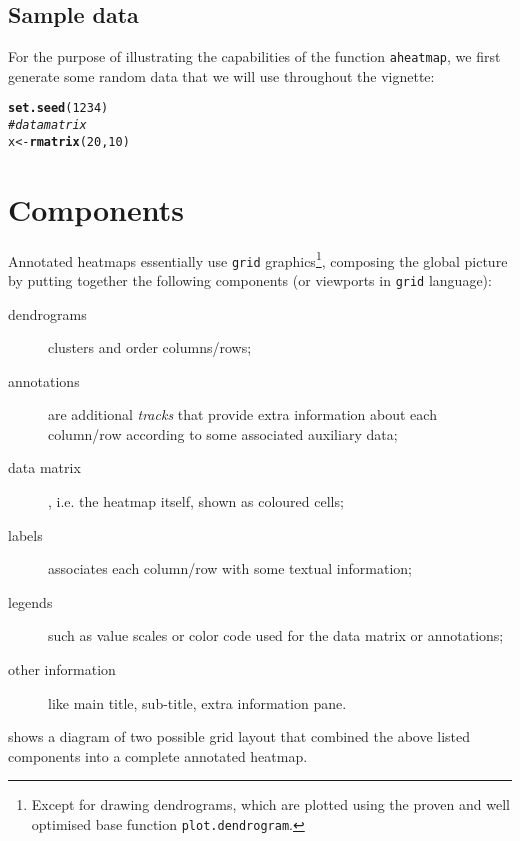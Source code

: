 \documentclass[a4paper]{article}\usepackage[]{graphicx}\usepackage[]{color}
\makeatletter
\newcommand{\hlnum}[1]{\textcolor[rgb]{0.686,0.059,0.569}{#1}}%
\newcommand{\hlcom}[1]{\textcolor[rgb]{0.678,0.584,0.686}{\textit{#1}}}%
\newcommand{\hlstd}[1]{\textcolor[rgb]{0.345,0.345,0.345}{#1}}%
\newcommand{\hlkwb}[1]{\textcolor[rgb]{0.69,0.353,0.396}{#1}}%
\newcommand{\hlkwd}[1]{\textcolor[rgb]{0.737,0.353,0.396}{\textbf{#1}}}%
\newenvironment{kframe}{%
 \def\at@end@of@kframe{}%
 \ifinner\ifhmode%
  \def\at@end@of@kframe{\end{minipage}}%
  \begin{minipage}{\columnwidth}%
 \fi\fi%
 \def\FrameCommand##1{\hskip\@totalleftmargin \hskip-\fboxsep
 \colorbox{shadecolor}{##1}\hskip-\fboxsep
     \hskip-\linewidth \hskip-\@totalleftmargin \hskip\columnwidth}%
 \MakeFramed {\advance\hsize-\width
   \@totalleftmargin\z@ \linewidth\hsize
   \@setminipage}}%
 {\par\unskip\endMakeFramed%
 \at@end@of@kframe}
\newenvironment{knitrout}{}{} %
\let\code=\texttt
\makeatother
\begin{document}
\subsection{Sample data}
For the purpose of illustrating the capabilities of the function
\code{aheatmap}, we first generate some random data that we will use throughout
the vignette:

\begin{knitrout}\small
{}\color{fgcolor}\begin{kframe}
\begin{alltt}
\hlkwd{set.seed}\hlstd{(}\hlnum{1234}\hlstd{)}
\hlcom{# data matrix}
\hlstd{x} \hlkwb{<-} \hlkwd{rmatrix}\hlstd{(}\hlnum{20}\hlstd{,} \hlnum{10}\hlstd{)}
\end{alltt}
\end{kframe}
\end{knitrout}

\section{Components}

Annotated heatmaps essentially use \code{grid} graphics\footnote{Except for
drawing dendrograms, which are plotted using the proven and well optimised base
function \code{plot.dendrogram}.}, composing the global picture by putting
together the following components (or viewports in \code{grid} language):

\begin{description}
  \item[dendrograms] clusters and order columns/rows; 
  \item[annotations] are additional \emph{tracks} that provide extra
  information about each column/row according to some associated auxiliary data;
  \item[data matrix], i.e. the heatmap itself, shown as coloured cells;
  \item[labels] associates each column/row with some textual information;
  \item[legends] such as value scales or color code used for the data matrix or
  annotations;
  \item[other information] like main title, sub-title, extra information pane.
\end{description}

 shows a diagram of two possible grid layout that combined
the above listed components into a complete annotated heatmap.
\end{document}

